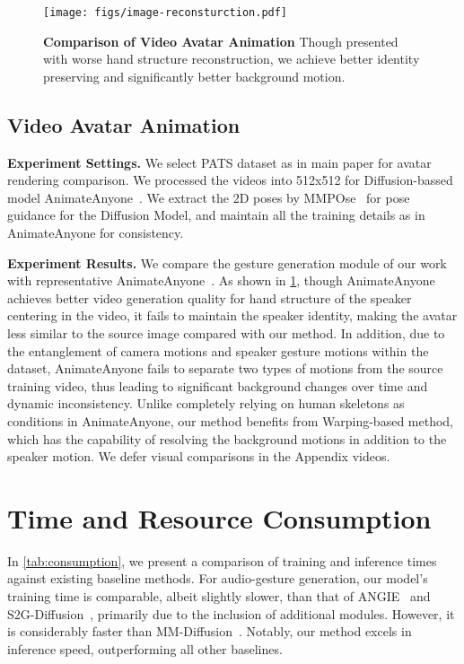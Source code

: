 \begin{figure}[t]
    \centering
    \texttt{[image: figs/image-reconsturction.pdf]}
    \vspace{-0.5cm}
    \caption{\small{\textbf{Comparison of Video Avatar Animation} Though presented with worse hand structure reconstruction, we achieve better identity preserving and significantly better background motion.}}
    \vspace{-0.5cm}
    \label{fig:image-reconst}
\end{figure}


\subsection{Video Avatar Animation}
\noindent\textbf{Experiment Settings.}
We select PATS dataset as in main paper for avatar rendering comparison. We processed the videos into 512x512 for Diffusion-bassed model AnimateAnyone~\cite{hu2023animateanyone}. We extract the 2D poses by MMPOse~\cite{mmpose2020} for pose guidance for the Diffusion Model, and maintain all the training details as in AnimateAnyone for consistency.

\noindent\textbf{Experiment Results.}
We compare the gesture generation module of our work with representative AnimateAnyone~\cite{hu2023animateanyone}. As shown in \cref{fig:image-reconst}, though AnimateAnyone achieves better video generation quality for hand structure of the speaker centering in the video, it fails to maintain the speaker identity, making the avatar less similar to the source image compared with our method. In addition, due to the entanglement of camera motions and speaker gesture motions within the dataset, AnimateAnyone fails to separate two types of motions from the source training video, thus leading to significant background changes over time and dynamic inconsistency. Unlike completely relying on human skeletons as conditions in AnimateAnyone, our method benefits from Warping-based method, which has the capability of resolving the background motions in addition to the speaker motion. We defer visual comparisons in the Appendix videos.



\section{Time and Resource Consumption}
\label{sec:sub-time}

In \cref{tab:consumption}, we present a comparison of training and inference times against existing baseline methods. For audio-gesture generation, our model's training time is comparable, albeit slightly slower, than that of ANGIE~\cite{angie} and S2G-Diffusion~\cite{s2gdiffusion}, primarily due to the inclusion of additional modules. However, it is considerably faster than MM-Diffusion~\cite{ruan2022mmdiffusion}. Notably, our method excels in inference speed, outperforming all other baselines.

